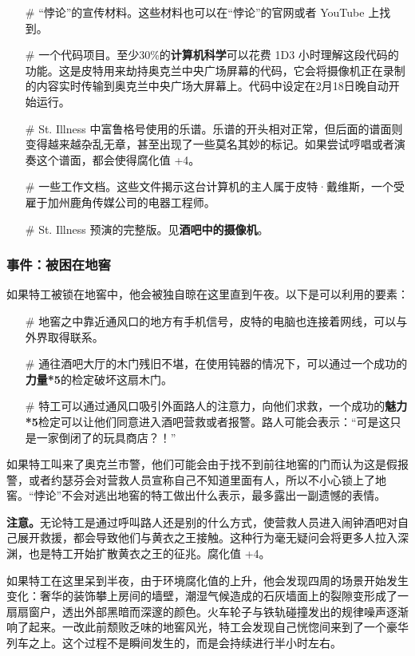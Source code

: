 \begin{itemize}
    \item[\#] “悖论”的宣传材料。这些材料也可以在“悖论”的官网或者 YouTube 上找到。
    \item[\#] 一个代码项目。至少30\%的\textbf{计算机科学}可以花费 1D3 小时理解这段代码的功能。这是皮特用来劫持奥克兰中央广场屏幕的代码，它会将摄像机正在录制的内容实时传输到奥克兰中央广场大屏幕上。代码中设定在2月18日晚自动开始运行。
    \item[\#] St. Illness 中富鲁格号使用的乐谱。乐谱的开头相对正常，但后面的谱面则变得越来越杂乱无章，甚至出现了一些莫名其妙的标记。如果尝试哼唱或者演奏这个谱面，都会使得腐化值 +4。
    \item[\#] 一些工作文档。这些文件揭示这台计算机的主人属于皮特·戴维斯，一个受雇于加州鹿角传媒公司的电器工程师。
    \item[\#] St. Illness 预演的完整版。见\textbf{酒吧中的摄像机}。
\end{itemize}

\subsubsection{事件：被困在地窖}

如果特工被锁在地窖中，他会被独自晾在这里直到午夜。以下是可以利用的要素：

\begin{itemize}
    \item[\#] 地窖之中靠近通风口的地方有手机信号，皮特的电脑也连接着网线，可以与外界取得联系。
    \item[\#] 通往酒吧大厅的木门残旧不堪，在使用钝器的情况下，可以通过一个成功的\textbf{力量*5}的检定破坏这扇木门。
    \item[\#] 特工可以通过通风口吸引外面路人的注意力，向他们求救，一个成功的\textbf{魅力*5}检定可以让他们同意进入酒吧营救或者报警。路人可能会表示：“可是这只是一家倒闭了的玩具商店？！”
\end{itemize}

如果特工叫来了奥克兰市警，他们可能会由于找不到前往地窖的门而认为这是假报警，或者约瑟芬会对营救人员宣称自己不知道里面有人，所以不小心锁上了地窖。“悖论”不会对逃出地窖的特工做出什么表示，最多露出一副遗憾的表情。

\textbf{注意。}无论特工是通过呼叫路人还是别的什么方式，使营救人员进入闹钟酒吧对自己展开救援，都会导致他们与黄衣之王接触。这种行为毫无疑问会将更多人拉入深渊，也是特工开始扩散黄衣之王的征兆。腐化值 +4。

如果特工在这里呆到半夜，由于环境腐化值的上升，他会发现四周的场景开始发生变化：奢华的装饰攀上房间的墙壁，潮湿气候造成的石灰墙面上的裂隙变形成了一扇扇窗户，透出外部黑暗而深邃的颜色。火车轮子与铁轨碰撞发出的规律噪声逐渐响了起来。一改此前颓败乏味的地窖风光，特工会发现自己恍惚间来到了一个豪华列车之上。这个过程不是瞬间发生的，而是会持续进行半小时左右。

